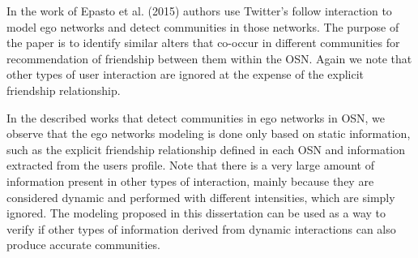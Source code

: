 In the work of Epasto et al. (2015) \cite{Epasto2015} authors use Twitter's follow interaction to model ego networks and detect communities in those networks. The purpose of the paper is to identify similar alters that co-occur in different communities for recommendation of friendship between them within the OSN. Again we note that other types of user interaction are ignored at the expense of the explicit friendship relationship.

In the described works that detect communities in ego networks in OSN, we observe that the ego networks modeling is done only based on static information, such as the explicit friendship relationship defined in each OSN and information extracted from the users profile. Note that there is a very large amount of information present in other types of interaction, mainly because they are considered dynamic and performed with different intensities, which are simply ignored. The modeling proposed in this dissertation can be used as a way to verify if other types of information derived from dynamic interactions can also produce accurate communities.




